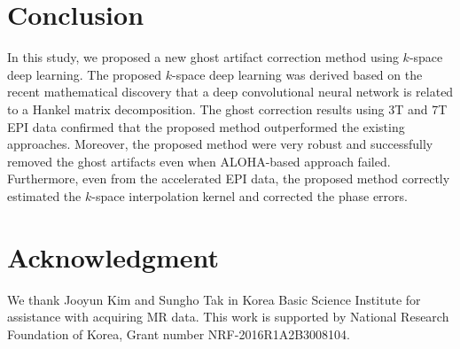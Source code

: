 \documentclass[num-refs]{wiley-article}
\newcommand{\0}{{\boldsymbol{0}}}
\newcommand{\1}{\blmath{1}}
\begin{document}
	
	\section{Conclusion}
	
	In this study, we proposed a new ghost artifact correction method using $k$-space deep learning. The proposed $k$-space  deep learning  was derived based on the recent mathematical discovery that a deep convolutional neural network is related to a Hankel matrix decomposition. The ghost correction results using 3T and 7T EPI data confirmed that the proposed method  outperformed the existing approaches. Moreover, the proposed method were very robust and successfully removed the ghost artifacts even when ALOHA-based approach failed.  Furthermore, even from the accelerated EPI data, the proposed method correctly	estimated the $k$-space interpolation kernel and corrected the phase errors.
	
	
	\section*{Acknowledgment}
	We thank Jooyun Kim and Sungho Tak in Korea Basic Science Institute for assistance with acquiring MR data. This work is supported by National Research Foundation of Korea, Grant number NRF-2016R1A2B3008104. 
	
	\clearpage
	
\end{document}
